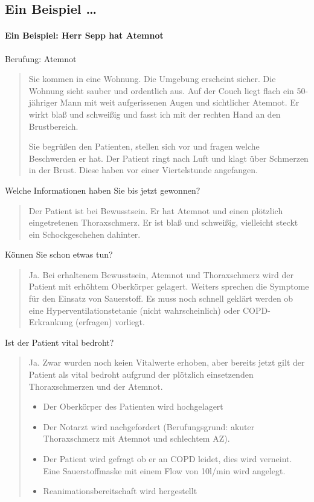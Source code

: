\subsection{Ein Beispiel \ldots}
\paragraph[Ein Beispiel: Herr Sepp hat Atemnot]{Ein Beispiel: Herr Sepp
hat Atemnot}


Berufung: Atemnot

\begin{quote}
Sie kommen in eine Wohnung. Die Umgebung erscheint sicher. Die Wohnung
sieht sauber und ordentlich aus. Auf der Couch liegt flach ein
50-j\"ahriger Mann mit weit aufgerissenen Augen und sichtlicher
Atemnot. Er wirkt bla{\ss} und schwei{\ss}ig und fasst ich mit der
rechten Hand an den Brustbereich.

Sie begr\"u{\ss}en den Patienten, stellen sich vor und fragen welche
Beschwerden er hat. Der Patient ringt nach Luft und klagt \"uber
Schmerzen in der Brust. Diese haben vor einer Viertelstunde angefangen.
\end{quote}

Welche Informationen haben Sie bis jetzt gewonnen?
\begin{quote}
Der Patient ist bei Bewusstsein. Er hat Atemnot und einen pl\"otzlich
eingetretenen Thoraxschmerz. Er ist bla{\ss} und schwei{\ss}ig,
vielleicht steckt ein Schockgeschehen dahinter.
\end{quote}
K\"onnen Sie schon etwas tun?
\begin{quote}
Ja.  Bei erhaltenem Bewusstsein, Atemnot und Thoraxschmerz wird der
Patient mit erh\"ohtem Oberk\"orper gelagert. Weiters sprechen die
Symptome f\"ur den Einsatz von Sauerstoff. Es muss noch schnell
gekl\"art werden ob eine Hyperventilationstetanie (nicht
wahrscheinlich) oder COPD-Erkrankung (erfragen) vorliegt.
\end{quote}
Ist der Patient vital bedroht?
\begin{quote}
Ja. Zwar wurden noch keien Vitalwerte erhoben, aber bereits jetzt gilt
der Patient als vital bedroht aufgrund der pl\"otzlich einsetzenden
Thoraxschmerzen und der Atemnot.

\begin{itemize}
    \item Der Oberk\"orper des Patienten wird hochgelagert
    \item Der Notarzt wird nachgefordert (Berufungsgrund: akuter
    Thoraxschmerz mit Atemnot und schlechtem AZ).
    \item Der Patient wird gefragt ob er an COPD leidet, dies wird verneint.
    Eine Sauerstoffmaske mit einem Flow von 10l/min wird angelegt.
    \item Reanimationsbereitschaft wird hergestellt
\end{itemize}
\end{quote}

